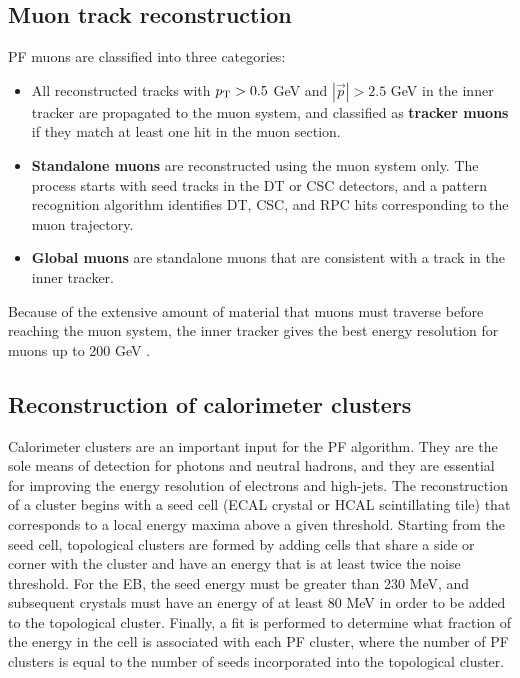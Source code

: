 \subsection{Muon track reconstruction}
\label{sec:muonTrackReco}
PF muons are classified into three categories:
\begin{itemize}[leftmargin=*]
\item All reconstructed tracks with $p_{\mathrm{T}} > 0.5$ GeV and $|\vec{p}| > 2.5$ GeV in the inner tracker are propagated to the muon system, and classified as \textbf{tracker muons} if they match at least one hit in the muon section. 
\item \textbf{Standalone muons} are reconstructed using the muon system only. The process starts with seed tracks in the DT or CSC detectors, and a pattern recognition algorithm identifies DT, CSC, and RPC hits corresponding to the muon trajectory.
\item \textbf{Global muons} are standalone muons that are consistent with a track in the inner tracker. 
\end{itemize}

Because of the extensive amount of material that muons must traverse before reaching the muon system, the inner tracker gives the best energy resolution for muons up to 200 GeV \cite{ParticleFlow}.

\subsection{Reconstruction of calorimeter clusters}
\label{sec:clusterReco}
Calorimeter clusters are an important input for the PF algorithm. They are the sole means of detection for photons and neutral hadrons, and they are essential for improving the energy resolution of electrons and high-\pt jets. The reconstruction of a cluster begins with a seed cell (ECAL crystal or HCAL scintillating tile) that corresponds to a local energy maxima above a given threshold. Starting from the seed cell, topological clusters are formed by adding cells that share a side or corner with the cluster and have an energy that is at least twice the noise threshold. For the EB, the seed energy must be greater than 230 MeV, and subsequent crystals must have an energy of at least 80 MeV in order to be added to the topological cluster. Finally, a fit is performed to determine what fraction of the energy in the cell is associated with each PF cluster, where the number of PF clusters is equal to the number of seeds incorporated into the topological cluster.

